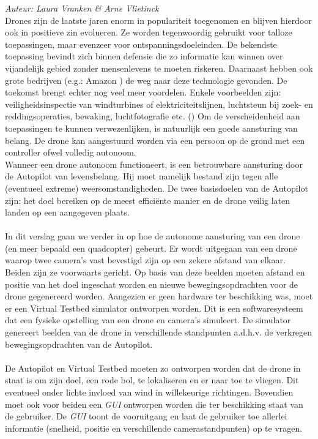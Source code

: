 {\em Auteur: Laura Vranken \& Arne Vlietinck}\\

\noindent
Drones zijn de laatste jaren enorm in populariteit toegenomen en blijven hierdoor ook in positieve zin evolueren. Ze worden tegenwoordig gebruikt voor talloze toepassingen, maar evenzeer voor ontspanningsdoeleinden. De bekendste toepassing bevindt zich binnen defensie die zo informatie kan winnen over vijandelijk gebied zonder mensenlevens te moeten riskeren. Daarnaast hebben ook grote bedrijven (e.g.: Amazon \cite{website:Amazon}) de weg naar deze technologie gevonden. De toekomst brengt echter nog veel meer voordelen. Enkele voorbeelden zijn: veiligheidsinspectie van windturbines of elektriciteitslijnen, luchtsteun bij zoek- en reddingsoperaties, bewaking, luchtfotografie etc. (\cite{website:microdrones}) Om de verscheidenheid aan toepassingen te kunnen verwezenlijken, is natuurlijk een goede aansturing van belang. De drone kan aangestuurd worden via een persoon op de grond met een controller ofwel volledig autonoom. 
\\
Wanneer een drone autonoom functioneert, is een betrouwbare aansturing door de Autopilot van levensbelang. Hij moet namelijk bestand zijn tegen alle (eventueel extreme) weersomstandigheden. De twee basisdoelen van de Autopilot zijn: het doel bereiken op de meest efficiënte manier en de drone veilig laten landen op een aangegeven plaats.
\\
\\
In dit verslag gaan we verder in op hoe de autonome aansturing van een drone (en meer bepaald een quadcopter) gebeurt. Er wordt uitgegaan van een drone waarop twee camera's vast bevestigd zijn op een zekere afstand van elkaar. Beiden zijn ze voorwaarts gericht. Op basis van deze beelden moeten afstand en positie van het doel ingeschat worden en nieuwe bewegingsopdrachten voor de drone gegenereerd worden. Aangezien er geen hardware ter beschikking was, moet er een Virtual Testbed simulator ontworpen worden. Dit is een softwaresysteem dat een fysieke opstelling van een drone en camera's simuleert. \cite{arcticle:opgavePeno} De simulator genereert beelden van de drone in verschillende standpunten a.d.h.v. de verkregen bewegingsopdrachten van de Autopilot. 
\\
\\
De Autopilot en Virtual Testbed moeten zo ontworpen worden dat de drone in staat is om zijn doel, een rode bol, te lokaliseren en er naar toe te vliegen. Dit eventueel onder lichte invloed van wind in willekeurige richtingen. Bovendien moet ook voor beiden een \textit{GUI} ontworpen worden die ter beschikking staat van de gebruiker. De \textit{GUI} toont de vooruitgang en laat de gebruiker toe allerlei informatie (snelheid, positie en verschillende camerastandpunten) op te vragen.
